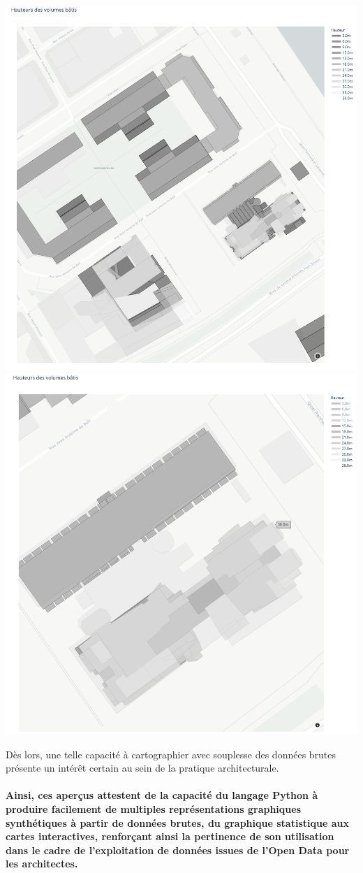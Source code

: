 \documentclass[
  11pt,
  french,
]{article}
\newcounter{customfigs}[section]
\newenvironment{customfigs}[1][] {
    \stepcounter{customfigs}
    Fig \arabic{section}. \arabic{customfigs} : }
\newcommand{\masked}{\vspace*{-\baselineskip}}
\begin{document}
\begin{tcolorbox}[title=\begin{customfigs} Carte des volumes par hauteur avec de l'interactivité \end{customfigs}]

\begin{center}\includegraphics[width=0.45\linewidth]{__imgs/carte_hauteurs_1} \includegraphics[width=0.45\linewidth]{__imgs/carte_hauteurs_2} \end{center}

\end{tcolorbox}

Dès lors, une telle capacité à cartographier avec souplesse des données
brutes présente un intérêt certain au sein de la pratique
architecturale.\\
~\\
\textbf{Ainsi, ces aperçus attestent de la capacité du langage Python à
produire facilement de multiples représentations graphiques synthétiques
à partir de données brutes, du graphique statistique aux cartes
interactives, renforçant ainsi la pertinence de son utilisation dans le
cadre de l'exploitation de données issues de l'Open Data pour les
architectes.}
\end{document}
